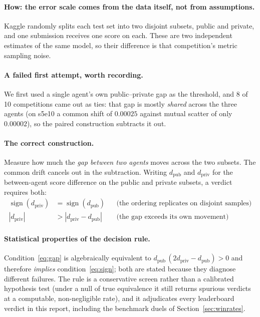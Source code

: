 \documentclass[11pt,a4paper]{article}
\begin{document}
\paragraph{How: the error scale comes from the data itself, not from assumptions.} Kaggle randomly splits each test set into two disjoint subsets, public and private, and one submission receives one score on each. These are two independent estimates of the same model, so their difference is that competition's metric sampling noise.

\paragraph{A failed first attempt, worth recording.} We first used a single agent's own public--private gap as the threshold, and 8 of 10 competitions came out as ties: that gap is mostly \emph{shared} across the three agents (on s5e10 a common shift of $0.00025$ against mutual scatter of only $0.00002$), so the paired construction subtracts it out.

\paragraph{The correct construction.} Measure how much the \emph{gap between two agents} moves across the two subsets. The common drift cancels out in the subtraction. Writing $d_{\mathrm{pub}}$ and $d_{\mathrm{priv}}$ for the between-agent score difference on the public and private subsets, a verdict requires both:
\begin{align}
\operatorname{sign}(d_{\mathrm{priv}}) &= \operatorname{sign}(d_{\mathrm{pub}})
  && \text{(the ordering replicates on disjoint samples)} \label{eq:sign} \\
|d_{\mathrm{priv}}| &> |d_{\mathrm{priv}} - d_{\mathrm{pub}}|
  && \text{(the gap exceeds its own movement)} \label{eq:gap}
\end{align}

\paragraph{Statistical properties of the decision rule.} Condition~\eqref{eq:gap} is algebraically equivalent to $d_{\mathrm{pub}}\,(2d_{\mathrm{priv}} - d_{\mathrm{pub}}) > 0$ and therefore \emph{implies} condition~\eqref{eq:sign}; both are stated because they diagnose different failures. The rule is a conservative screen rather than a calibrated hypothesis test (under a null of true equivalence it still returns spurious verdicts at a computable, non-negligible rate), and it adjudicates every leaderboard verdict in this report, including the benchmark duels of Section~\ref{sec:winrates}.
\end{document}
